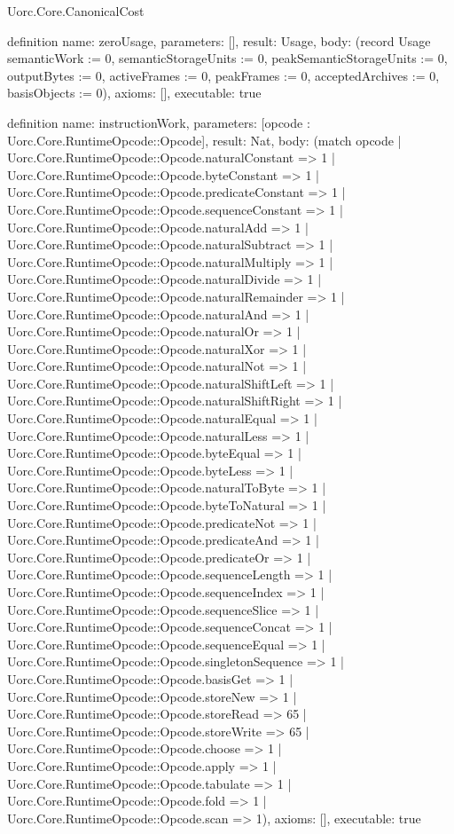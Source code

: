 \begin{lexlean}{Uorc.Core.CanonicalCost}
\begin{semanticmodule}
definition{
  name: zeroUsage,
  parameters: [],
  result: Usage,
  body: (record Usage {semanticWork := 0, semanticStorageUnits := 0, peakSemanticStorageUnits := 0, outputBytes := 0, activeFrames := 0, peakFrames := 0, acceptedArchives := 0, basisObjects := 0}),
  axioms: [],
  executable: true
}

definition{
  name: instructionWork,
  parameters: [opcode : Uorc.Core.RuntimeOpcode::Opcode],
  result: Nat,
  body: (match opcode
    | Uorc.Core.RuntimeOpcode::Opcode.naturalConstant => 1
    | Uorc.Core.RuntimeOpcode::Opcode.byteConstant => 1
    | Uorc.Core.RuntimeOpcode::Opcode.predicateConstant => 1
    | Uorc.Core.RuntimeOpcode::Opcode.sequenceConstant => 1
    | Uorc.Core.RuntimeOpcode::Opcode.naturalAdd => 1
    | Uorc.Core.RuntimeOpcode::Opcode.naturalSubtract => 1
    | Uorc.Core.RuntimeOpcode::Opcode.naturalMultiply => 1
    | Uorc.Core.RuntimeOpcode::Opcode.naturalDivide => 1
    | Uorc.Core.RuntimeOpcode::Opcode.naturalRemainder => 1
    | Uorc.Core.RuntimeOpcode::Opcode.naturalAnd => 1
    | Uorc.Core.RuntimeOpcode::Opcode.naturalOr => 1
    | Uorc.Core.RuntimeOpcode::Opcode.naturalXor => 1
    | Uorc.Core.RuntimeOpcode::Opcode.naturalNot => 1
    | Uorc.Core.RuntimeOpcode::Opcode.naturalShiftLeft => 1
    | Uorc.Core.RuntimeOpcode::Opcode.naturalShiftRight => 1
    | Uorc.Core.RuntimeOpcode::Opcode.naturalEqual => 1
    | Uorc.Core.RuntimeOpcode::Opcode.naturalLess => 1
    | Uorc.Core.RuntimeOpcode::Opcode.byteEqual => 1
    | Uorc.Core.RuntimeOpcode::Opcode.byteLess => 1
    | Uorc.Core.RuntimeOpcode::Opcode.naturalToByte => 1
    | Uorc.Core.RuntimeOpcode::Opcode.byteToNatural => 1
    | Uorc.Core.RuntimeOpcode::Opcode.predicateNot => 1
    | Uorc.Core.RuntimeOpcode::Opcode.predicateAnd => 1
    | Uorc.Core.RuntimeOpcode::Opcode.predicateOr => 1
    | Uorc.Core.RuntimeOpcode::Opcode.sequenceLength => 1
    | Uorc.Core.RuntimeOpcode::Opcode.sequenceIndex => 1
    | Uorc.Core.RuntimeOpcode::Opcode.sequenceSlice => 1
    | Uorc.Core.RuntimeOpcode::Opcode.sequenceConcat => 1
    | Uorc.Core.RuntimeOpcode::Opcode.sequenceEqual => 1
    | Uorc.Core.RuntimeOpcode::Opcode.singletonSequence => 1
    | Uorc.Core.RuntimeOpcode::Opcode.basisGet => 1
    | Uorc.Core.RuntimeOpcode::Opcode.storeNew => 1
    | Uorc.Core.RuntimeOpcode::Opcode.storeRead => 65
    | Uorc.Core.RuntimeOpcode::Opcode.storeWrite => 65
    | Uorc.Core.RuntimeOpcode::Opcode.choose => 1
    | Uorc.Core.RuntimeOpcode::Opcode.apply => 1
    | Uorc.Core.RuntimeOpcode::Opcode.tabulate => 1
    | Uorc.Core.RuntimeOpcode::Opcode.fold => 1
    | Uorc.Core.RuntimeOpcode::Opcode.scan => 1),
  axioms: [],
  executable: true
}


\end{semanticmodule}
\end{lexlean}

